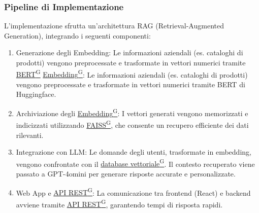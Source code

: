 \subsubsection{Pipeline di Implementazione}
L'implementazione sfrutta un'architettura RAG (Retrieval-Augmented Generation), integrando i seguenti componenti:
\begin{enumerate}
    \item Generazione degli Embedding: Le informazioni aziendali (es. cataloghi di prodotti) vengono preprocessate e trasformate in vettori numerici tramite \href{https://code7crusaders.github.io/docs/RTB/documentazione_interna/glossario.html#bert-bidirectional-encoder-representations-from-transformers}{BERT\textsuperscript{G}} \href{https://code7crusaders.github.io/docs/RTB/documentazione_interna/glossario.html#embedding}{Embedding\textsuperscript{G}}: Le informazioni aziendali (es. cataloghi di prodotti) vengono preprocessate e trasformate in vettori numerici tramite BERT di Huggingface.
    \item Archiviazione degli \href{https://code7crusaders.github.io/docs/RTB/documentazione_interna/glossario.html#embedding}{Embedding\textsuperscript{G}}: I vettori generati vengono memorizzati e indicizzati utilizzando \href{https://code7crusaders.github.io/docs/RTB/documentazione_interna/glossario.html#faiss}{FAISS\textsuperscript{G}}, che consente un recupero efficiente dei dati rilevanti.
    \item Integrazione con LLM: Le domande degli utenti, trasformate in embedding, vengono confrontate con il \href{https://code7crusaders.github.io/docs/RTB/documentazione_interna/glossario.html#database-vettoriale}{database vettoriale\textsuperscript{G}}. Il contesto recuperato viene passato a GPT-4omini per generare risposte accurate e personalizzate.
    \item Web App e \href{https://code7crusaders.github.io/docs/RTB/documentazione_interna/glossario.html#api-rest-representational-state-transfer}{API REST\textsuperscript{G}}: La comunicazione tra frontend (React) e backend avviene tramite \href{https://code7crusaders.github.io/docs/RTB/documentazione_interna/glossario.html#api-rest-representational-state-transfer}{API REST\textsuperscript{G}}, garantendo tempi di risposta rapidi.
\end{enumerate}

